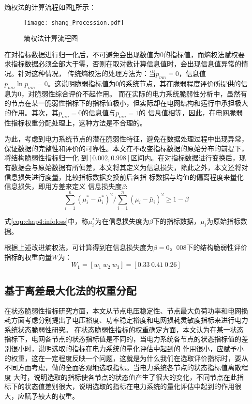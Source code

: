 熵权法的计算流程如图\ref{fig:shang_Procession}所示：
\begin{figure}[H] %
  \centering
  \texttt{[image: shang\_Procession.pdf]}
  \caption{熵权法计算流程图}
  \label{fig:shang_Procession}
\end{figure}

在对指标数据进行归一化后，不可避免会出现数值为0的指标值，而熵权法赋权要求指标数据必须全部大于零，否则在取对数计算信息值时，会出现信息值异常的情况。针对这种情况，
传统熵权法的处理方法为：当$p_{mn}=0$，信息值$p_{m n} \ln p_{m n}=0$。这说明脆弱指标值为0的系统节点，其在脆弱程度评价所提供的信息为0，对脆弱性综合评价不起作用。
而在实际的电力系统脆弱性分析中，虽然有的节点在某一脆弱性指标下的指标值极小，但实际却在电网结构和运行中承担极大的作用。其次，其$p_{mn}=0$的信息值与$p_{mn}=1$的
信息值相等，因此，在电网脆弱性指标权重分配处理上，这种方法是不合理的。

为此，考虑到电力系统节点的潜在脆弱性特征，避免在数据处理过程中出现异常，保证数据的完整性和评价的可靠性。本文在不改变指标数据的原始分布的前提下，将结构脆弱性指标归一化
到$[0.002,0.998]$区间内。在对指标数据进行变换后，现有数据会与原始数据有所偏差，本文将其定义为信息损失，除此之外，本文还将对信息损失进行度量，比较指标数据变换前后各指
标数据与均值的偏离程度来量化信息损失，即用方差来定义
信息损失度$\beta$:
\begin{equation}
  \label{equ:chap4:infoloss}
\sum_{i=1}^{n}\left(\mu_{i}^{*}-\bar{\mu}_{i}^{*}\right)^{2} /\sum_{i=1}^{n}\left(\mu_{i}-\bar{\mu}_{i}\right)^{2} \geq 1-\beta 
\end{equation}

式\ref{equ:chap4:infoloss}中，称$\mu_{i}^{*}$为在信息损失度为$\beta$下的指标数据，$\mu_{i}$为原始指标数据。

根据上述改进熵权法，可计算得到在信息损失度为$\beta=0。008$下的结构脆弱性评价指标的权重向量$W$为：
\begin{equation}
  \label{equ:chap4:shang2}
    W_1 = \left[w_{1}\ w_{2}\ w_{3}\right]=[0.33\ 0.41\ 0.26]
    \end{equation}



\subsection{基于离差最大化法的权重分配}
\label{sec:nomalz}
在状态脆弱性指标研究方面，本文从节点电压稳定性、节点最大负荷功率和电网损耗方面考虑分别提出了电压裕度、功率稳定裕度和电网损耗灵敏度指标来进行电力系统状态脆弱性研究。
在状态脆弱性指标的权重确定方面，本文认为在某一状态指标下，电网各节点的状态指标值是不同的，当电力系统各节点的状态指标值的差别很小时，说明选取的指标在电力系统的量化评估中起到的
作用很小，应赋予小的权重，这在一定程度反映一个问题，这就是为什么我们在选取评价指标时，要从不同方面考虑，做的全面客观地选取指标。当电力系统各节点的状态指标值离散程度
大时，说明选取的指标使各节点的状态值产生了很大的变化，不同节点在此指标下的状态值差别很大，说明选取的指标在电力系统的量化评估中起到的作用很大，应赋予较大的权重。

